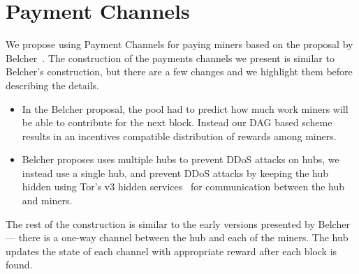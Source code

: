 \documentclass{article}
\begin{document}


\section{Payment Channels}\label{ref:channels}

We propose using Payment Channels for paying miners based on the
proposal by Belcher~\cite{channels-for-rewards}. The construction of
the payments channels we present is similar to Belcher's construction,
but there are a few changes and we highlight them before describing
the details.

\begin{itemize}
\item In the Belcher proposal, the pool had to predict how much work
  miners will be able to contribute for the next block. Instead our
  DAG based scheme results in an incentives compatible distribution of
  rewards among miners.
\item Belcher proposes uses multiple hubs to prevent DDoS attacks on
  hubs, we instead use a single hub, and prevent DDoS attacks by
  keeping the hub hidden using Tor's v3 hidden
  services~\cite{tor-design} for communication between the hub and
  miners.
\end{itemize}

The rest of the construction is similar to the early versions
presented by Belcher --- there is a one-way channel between the hub
and each of the miners. The hub updates the state of each channel with
appropriate reward after each block is found.

\end{document}
